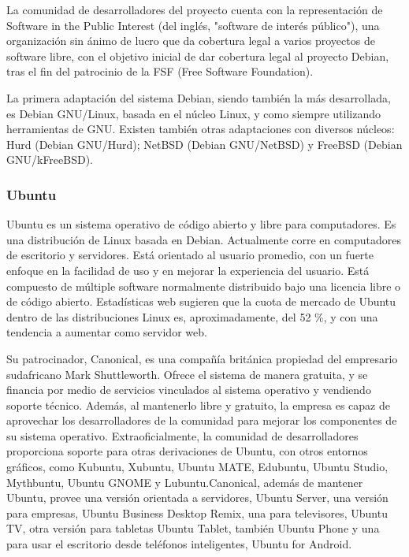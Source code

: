 La comunidad de desarrolladores del proyecto cuenta con la representación de Software in the Public Interest (del inglés, "software de interés público"), una organización sin ánimo de lucro que da cobertura legal a varios proyectos de software libre, con el objetivo inicial de dar cobertura legal al proyecto Debian, tras el fin del patrocinio de la FSF (Free Software Foundation).

La primera adaptación del sistema Debian, siendo también la más desarrollada, es Debian GNU/Linux, basada en el núcleo Linux, y como siempre utilizando herramientas de GNU. Existen también otras adaptaciones con diversos núcleos: Hurd (Debian GNU/Hurd); NetBSD (Debian GNU/NetBSD) y FreeBSD (Debian GNU/kFreeBSD).

\subsubsection{Ubuntu}
Ubuntu es un sistema operativo de código abierto y libre para computadores. Es una distribución de Linux basada en Debian. Actualmente corre en computadores de escritorio y servidores. Está orientado al usuario promedio, con un fuerte enfoque en la facilidad de uso y en mejorar la experiencia del usuario. Está compuesto de múltiple software normalmente distribuido bajo una licencia libre o de código abierto. Estadísticas web sugieren que la cuota de mercado de Ubuntu dentro de las distribuciones Linux es, aproximadamente, del 52 \%, y con una tendencia a aumentar como servidor web.

Su patrocinador, Canonical, es una compañía británica propiedad del empresario sudafricano Mark Shuttleworth. Ofrece el sistema de manera gratuita, y se financia por medio de servicios vinculados al sistema operativo y vendiendo soporte técnico. Además, al mantenerlo libre y gratuito, la empresa es capaz de aprovechar los desarrolladores de la comunidad para mejorar los componentes de su sistema operativo. Extraoficialmente, la comunidad de desarrolladores proporciona soporte para otras derivaciones de Ubuntu, con otros entornos gráficos, como Kubuntu, Xubuntu, Ubuntu MATE, Edubuntu, Ubuntu Studio, Mythbuntu, Ubuntu GNOME y Lubuntu.Canonical, además de mantener Ubuntu, provee una versión orientada a servidores, Ubuntu Server, una versión para empresas, Ubuntu Business Desktop Remix, una para televisores, Ubuntu TV, otra versión para tabletas Ubuntu Tablet, también Ubuntu Phone y una para usar el escritorio desde teléfonos inteligentes, Ubuntu for Android.

